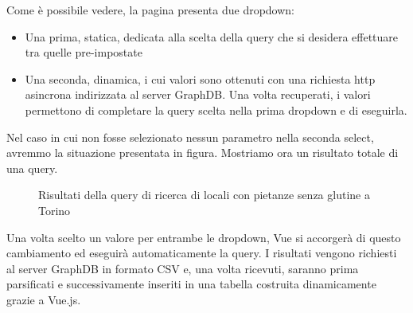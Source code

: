 \documentclass[12pt]{article}
\begin{document}
Come è possibile vedere, la pagina presenta due dropdown:
\begin{itemize}
    \item Una prima, statica, dedicata alla scelta della query che si desidera effettuare tra quelle pre-impostate
    \item Una seconda, dinamica, i cui valori sono ottenuti con una richiesta http asincrona indirizzata al server GraphDB. Una volta recuperati, i valori permettono di completare la query scelta nella prima dropdown e di eseguirla.
\end{itemize}
Nel caso in cui non fosse selezionato nessun parametro nella seconda select, avremmo la situazione presentata in figura. Mostriamo ora un risultato totale di una query.
\begin{figure}[H]
    \caption{Risultati della query di ricerca di locali con pietanze senza glutine a Torino}
\end{figure}
Una volta scelto un valore per entrambe le dropdown, Vue si accorgerà di questo cambiamento ed eseguirà automaticamente la query. I risultati vengono richiesti al server GraphDB in formato CSV e, una volta ricevuti, saranno prima parsificati e successivamente inseriti in una tabella costruita dinamicamente grazie a Vue.js.
\end{document}
